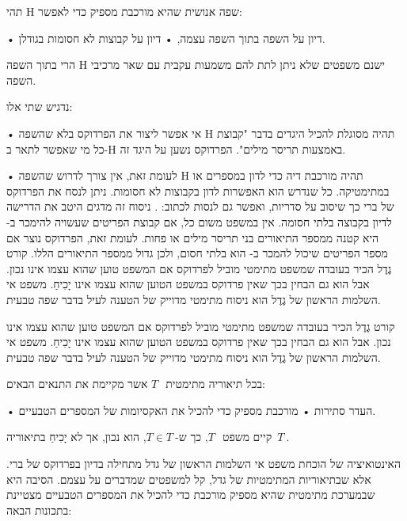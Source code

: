 \begin{mybox}
תהי H שפה אנושית שהיא מורכבת מספיק כדי לאפשר:
\begin{itemize}
• דיון על השפה בתוך השפה עצמה,
• דיון על קבוצות לא חסומות בגודלן.
\end{itemize}
הרי בתוך השפה H ישנם משפטים שלא ניתן לתת להם משמעות עקבית עם שאר מרכיבי השפה.
\end{mybox}

נדגיש שתי אלו:
\begin{itemize}
• אי אפשר ליצור את הפרדוקס בלא שהשפה H תהיה מסוגלת להכיל היגדים בדבר "קבוצת כל
מי שאפשר לתאר ב-H באמצעות תריסר מילים". הפרדוקס נשען על היגד זה.

• לעומת זאת, אין צורך לדרוש שהשפה H תהיה מורכבת דיה כדי לדון במספרים או
במתימטיקה. כל שנדרש הוא האפשרות לדון בקבוצות לא חסומות. ניתן לנסח את הפרדוקס של
ברי כך שיסוב על סדריות, ואפשר גם לנסות לכתוב: . ניסוח זה מדגים היטב את
הדרישה לדיון בקבוצה בלתי חסומה. אין במשפט משום כל, אם קבוצת הפריטים שעשויה
להימכר ב- היא קטנה ממספר התיאורים בני תריסר מילים או פחות. לעומת זאת,
הפרדוקס נוצר אם מספר הפריטים שיכול להמכר ב- הוא בלתי חסום, ולכן גדול
ממספר התיאורים הללו.  קורט גֶדֶל הכיר בעובדה שמשפט מתימטי מוביל לפרדוקס אם המשפט
טוען שהוא עצמו אינו נכון. אבל הוא גם הבחין בכך שאין פרדוקס במשפט הטוען שהוא
עצמו אינו יָכִיחַ. משפט אי השלמות הראשון של גֶדֶל הוא ניסוח מתימטי מדוייק של הטענה
לעיל בדבר שפה טבעית.

\end{itemize}

קורט גֶדֶל הכיר בעובדה שמשפט מתימטי מוביל לפרדוקס אם המשפט טוען שהוא עצמו אינו
נכון. אבל הוא גם הבחין בכך שאין פרדוקס במשפט הטוען שהוא עצמו אינו יָכִיחַ. משפט אי
השלמות הראשון של גֶדֶל הוא ניסוח מתימטי מדוייק של הטענה לעיל בדבר שפה טבעית.

\begin{mybox}
בכל תיאוריה מתימטית~$ T~$ אשר מקיימת את התנאים הבאים:
\begin{itemize}
• העדר סתירות
• מורכבת מספיק כדי להכיל את האקסיומות של המספרים הטבעיים.
\end{itemize}
קיים משפט~$ T~$, כך ש-$ T∈T~$, הוא נכון, אך לא יָכִיחַ בתיאוריה~$ T~$.
\end{mybox}
האינטואיציה של הוכחת משפט אי השלמות הראשון של גדל מתחילה בדיון בפרדוקס של ברי.
אלא שבתיאוריות המתימטיות של גדל, קל למשפטים שמדברים על עצמם. הסיבה היא שבמערכת
מתימטית שהיא מספיק מורכבת כדי להכיל את המספרים הטבעיים מצטיינת בתכונות הבאה:

